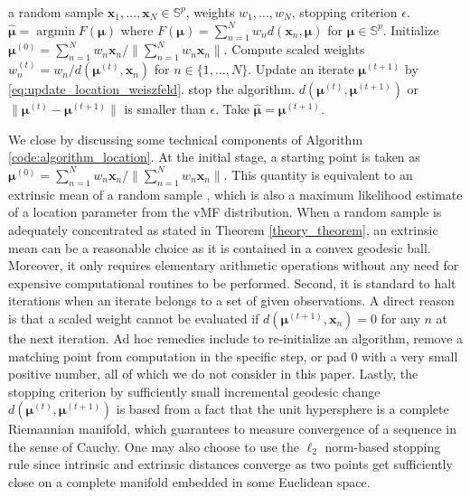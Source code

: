 \documentclass[10pt]{article}
\DeclareMathOperator*{\argmin}{argmin}
\newcommand{\bfx}{\mathbf{x}}
\newcommand{\bfmu}{\boldsymbol{\mu}}
\newcommand{\bbS}{\mathbb{S}}
\newcommand{\Frechet}{Fr\'{e}chet }
\begin{document}
\begin{algorithm}[t]
	\caption{Weighted \Frechet median computation}
	\label{code:algorithm_location}
	\begin{algorithmic}
		\REQUIRE a random sample $\bfx_1, \ldots, \bfx_N \in \bbS^p$,  weights $w_1, \ldots, w_N$, stopping criterion $\epsilon$.
		\ENSURE $\hat{\bfmu} = \argmin F(\bfmu)$ where $F(\bfmu) =  \sum_{n=1}^N w_n  d (\bfx_n, \bfmu)$ for $\bfmu \in \bbS^p$. 
		\STATE Initialize $\bfmu^{(0)} = \sum_{n=1}^N w_n \bfx_n / \| \sum_{n=1}^N w_n \bfx_n \|$.
		\REPEAT 
		\STATE Compute scaled weights $w_n^{(t)} = w_n / d(\bfmu^{(t)}, \bfx_n)$ for $n\in\lbrace 1,\ldots, N\rbrace$. 
		\STATE Update an iterate $\bfmu^{(t+1)}$ by \eqref{eq:update_location_weiszfeld}.
		\IF{$\bfmu^{(t+1)}$ equals to one of $\bfx_1, \ldots, \bfx_N$}
		\STATE stop the algorithm.
		\ENDIF
		\UNTIL $d(\bfmu^{(t)}, \bfmu^{(t+1)})$ or  $\| \bfmu^{(t)} - \bfmu^{(t+1)} \|$ is smaller than $\epsilon$.
		\STATE  Take $\hat{\bfmu} = \bfmu^{(t+1)}$.
	\end{algorithmic}
\end{algorithm}

We close by discussing some technical components of Algorithm \ref{code:algorithm_location}. At the initial stage, a starting point is taken as $\bfmu^{(0)} = \sum_{n=1}^N w_n \bfx_n / \| \sum_{n=1}^N w_n \bfx_n\|$. This quantity is equivalent to an extrinsic mean of a random sample \cite{bhattacharya_2012_NonparametricInferenceManifolds}, which is also a maximum likelihood estimate of a location parameter from the vMF distribution. When a random sample is adequately concentrated as stated in Theorem \ref{theory_theorem}, an extrinsic mean can be a reasonable choice as it is contained in a convex geodesic ball. Moreover, it only requires elementary arithmetic operations without any need for expensive computational routines to be performed. Second, it is standard to halt iterations when an iterate belongs to a set of given observations. A direct reason is that a scaled weight cannot be evaluated if $d(\bfmu^{(t+1)}, \bfx_n)=0$ for any $n$ at the next iteration. Ad hoc remedies include to re-initialize an algorithm, remove a matching point from computation in the specific step, or pad 0 with a very small positive number, all of which we do not consider in this paper. Lastly, the stopping criterion by sufficiently small incremental geodesic change $d(\bfmu^{(t)}, \bfmu^{(t+1)})$ is based from a fact that the unit hypersphere is a complete Riemannian manifold, which guarantees to measure convergence of a sequence in the sense of Cauchy. One may also choose to use the $\ell_2$ norm-based stopping rule since intrinsic and extrinsic distances converge as two points get sufficiently close on a complete manifold embedded in some Euclidean space. 
\end{document}
